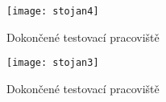 \begin{figure}[h]
  \centering
  \texttt{[image: stojan4]}
  \caption{Dokončené testovací pracoviště}
  \label{fig:stojan4}
\end{figure}

\begin{figure}[h]
  \centering
  \texttt{[image: stojan3]}
  \caption{Dokončené testovací pracoviště}
  \label{fig:stojan3}
\end{figure}



\endinput
